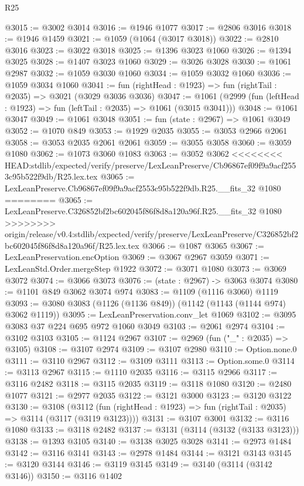 \begin{lexlean}{R25}
\begin{coremodule}
{{{{{{{{{{{{{{{{{{{{{{{{{{{{{{{{{{{{{{{{{{{{{{{{{{{{{@3015 := @3002 @3014
@3016 := @1946 @1077
@3017 := @2806 @3016
@3018 := @1946 @1459
@3021 := @1059 (@1064 (@3017 @3018))
@3022 := @2810 @3016
@3023 := @3022 @3018
@3025 := @1396 @3023 @1060
@3026 := @1394 @3025
@3028 := @1407 @3023 @1060
@3029 := @3026 @3028
@3030 := @1061 @2987
@3032 := @1059 @3030 @1060
@3034 := @1059 @3032 @1060
@3036 := @1059 @3034 @1060
@3041 := fun (rightHead : @1923) => fun (rightTail : @2035) => @3021 (@3029 @3036 @3036)
@3047 := @1061 (@2999 (fun (leftHead : @1923) => fun (leftTail : @2035) => @1061 (@3015 @3041)))
@3048 := @1061 @3047
@3049 := @1061 @3048
@3051 := fun (state : @2967) => @1061 @3049
@3052 := @1070 @849
@3053 := @1929 @2035
@3055 := @3053 @2966 @2061
@3058 := @3053 @2035 @2061 @2061
@3059 := @3055 @3058
@3060 := @3059 @1080
@3062 := @1073 @3060 @1083
@3063 := @3052 @3062
<<<<<<<< HEAD:stdlib/expected/verify/preserve/LexLeanPreserve/Cb96867ef09f9a9acf2553c95b522f9db/R25.lex.tex
@3065 := LexLeanPreserve.Cb96867ef09f9a9acf2553c95b522f9db.R25.__fits_32 @1080
========
@3065 := LexLeanPreserve.C326852bf2bc602045f86f8d8a120a96f.R25.__fits_32 @1080
>>>>>>>> origin/release/v0.4:stdlib/expected/verify/preserve/LexLeanPreserve/C326852bf2bc602045f86f8d8a120a96f/R25.lex.tex
@3066 := @1087 @3065
@3067 := LexLeanPreservation.encOption
@3069 := @3067 @2967 @3059
@3071 := LexLeanStd.Order.mergeStep @1922
@3072 := @3071 @1080
@3073 := @3069 @3072
@3074 := @3066 @3073
@3076 := (state : @2967) -> @3063 @3074
@3080 := @1101 @849 @3062 @3074 @974
@3083 := @1109 (@1116 @3060) @1119
@3093 := @3080 @3083 (@1126 (@1136 @849)) (@1142 (@1143 (@1144 @974) @3062 @1119))
@3095 := LexLeanPreservation.conv_let @1069
@3102 := @3095 @3083 @37 @224 @695 @972 @1060 @3049
@3103 := @2061 @2974
@3104 := @3102 @3103
@3105 := @1124 @2967
@3107 := @2969 (fun ("_" : @2035) => @3105)
@3108 := @3107 @2974
@3109 := @3107 @2980
@3110 := Option.none.{0}
@3111 := @3110 @2967
@3112 := @3109 @3111
@3113 := Option.some.{0}
@3114 := @3113 @2967
@3115 := @1110 @2035
@3116 := @3115 @2966
@3117 := @3116 @2482
@3118 := @3115 @2035
@3119 := @3118 @1080
@3120 := @2480 @1077
@3121 := @2977 @2035
@3122 := @3121 @3000
@3123 := @3120 @3122
@3130 := @3108
    (@3112 (fun (rightHead : @1923) => fun (rightTail : @2035) => @3114 (@3117 (@3119 @3123))))
@3131 := @3107 @3001
@3132 := @3116 @1080
@3133 := @3118 @2482
@3137 := @3131 (@3114 (@3132 (@3133 @3123)))
@3138 := @1393 @3105
@3140 := @3138 @3025 @3028
@3141 := @2973 @1484
@3142 := @3116 @3141
@3143 := @2978 @1484
@3144 := @3121 @3143
@3145 := @3120 @3144
@3146 := @3119 @3145
@3149 := @3140 (@3114 (@3142 @3146))
@3150 := @3116 @1402
}}}}}}}}}}}}}}}}}}}}}}}}}}}}}}}}}}}}}}}}}}}}}}}}}}}}}
\end{coremodule}
\end{lexlean}
